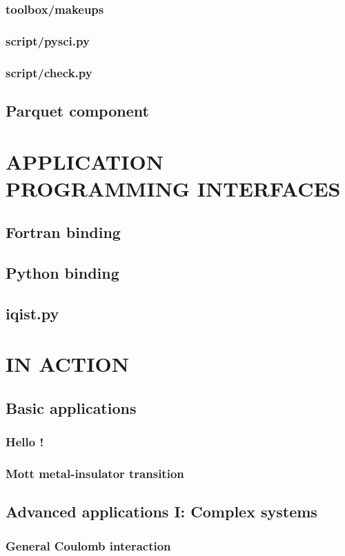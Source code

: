 \documentclass[10pt]{book}
\begin{document}
\subsection{toolbox/makeups}
\subsection{script/pysci.py}
\subsection{script/check.py}
\section{Parquet component}

\chapter{APPLICATION PROGRAMMING INTERFACES}
\section{Fortran binding}
\section{Python binding}
\section{iqist.py}

\chapter{{\iqist} IN ACTION}
\section{Basic applications}
\subsection{Hello {\iqist}!}
\subsection{Mott metal-insulator transition}
\section{Advanced applications I: Complex systems}
\subsection{General Coulomb interaction}
\end{document}
